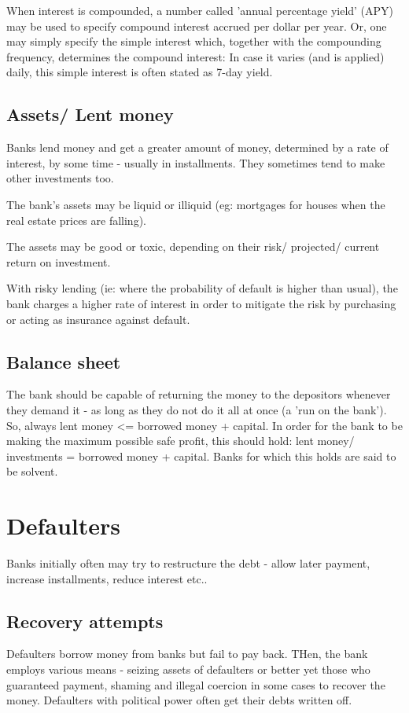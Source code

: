 \documentclass[oneside, article]{memoir}
\begin{document}
When interest is compounded, a number called 'annual percentage yield' (APY) may be used to specify compound interest accrued per dollar per year. Or, one may simply specify the simple interest which, together with the compounding frequency, determines the compound interest: In case it varies (and is applied) daily, this simple interest is often stated  as 7-day yield.

\subsection{Assets/ Lent money}
Banks lend money and get a greater amount of money, determined by a rate of interest, by some time - usually in installments. They sometimes tend to make other investments too.

The bank's assets may be liquid or illiquid (eg: mortgages for houses when the real estate prices are falling).

The assets may be good or toxic, depending on their risk/ projected/ current return on investment.

With risky lending (ie: where the probability of default is higher than usual), the bank charges a higher rate of interest in order to mitigate the risk by purchasing or acting as insurance against default.

\subsection{Balance sheet}
The bank should be capable of returning the money to the depositors whenever they demand it - as long as they do not do it all at once (a 'run on the bank'). So, always lent money <= borrowed money + capital. In order for the bank to be making the maximum possible safe profit, this should hold: lent money/ investments = borrowed money + capital. Banks for which this holds are said to be solvent.

\section{Defaulters}
Banks initially often may try to restructure the debt - allow later payment, increase installments, reduce interest etc..

\subsection{Recovery attempts}
Defaulters borrow money from banks but fail to pay back. THen, the bank employs various means - seizing assets of defaulters or better yet those who guaranteed payment, shaming and illegal coercion in some cases to recover the money. Defaulters with political power often get their debts written off.
\end{document}
